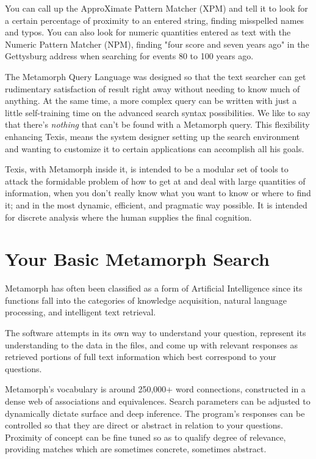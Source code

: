 You can call up the ApproXimate Pattern Matcher (XPM) and tell it to
look for a certain percentage of proximity to an entered string,
finding misspelled names and typos.  You can also look for numeric
quantities entered as text with the Numeric Pattern Matcher (NPM),
finding "four score and seven years ago" in the Gettysburg address
when searching for events 80 to 100 years ago.

The Metamorph Query Language was designed so that the text searcher
can get rudimentary satisfaction of result right away without needing
to know much of anything.  At the same time, a more complex query can
be written with just a little self-training time on the advanced
search syntax possibilities.  We like to say that there's {\em
nothing} that can't be found with a Metamorph query.  This flexibility
enhancing Texis, means the system designer setting up the search
environment and wanting to customize it to certain applications can
accomplish all his goals.

Texis, with Metamorph inside it, is intended to be a modular set of
tools to attack the formidable problem of how to get at and deal with
large quantities of information, when you don't really know what you
want to know or where to find it; and in the most dynamic, efficient,
and pragmatic way possible.  It is intended for discrete analysis
where the human supplies the final cognition.


\section{Your Basic Metamorph Search}

Metamorph has often been classified as a form of Artificial
Intelligence since its functions fall into the categories of knowledge
acquisition, natural language processing, and intelligent text
retrieval.

The software attempts in its own way to understand your question,
represent its understanding to the data in the files, and come up with
relevant responses as retrieved portions of full text information
which best correspond to your questions.

Metamorph's vocabulary is around 250,000+ word connections,
constructed in a dense web of associations and equivalences.  Search
parameters can be adjusted to dynamically dictate surface and deep
inference.  The program's responses can be controlled so that they are
direct or abstract in relation to your questions.  Proximity of
concept can be fine tuned so as to qualify degree of relevance,
providing matches which are sometimes concrete, sometimes abstract.

